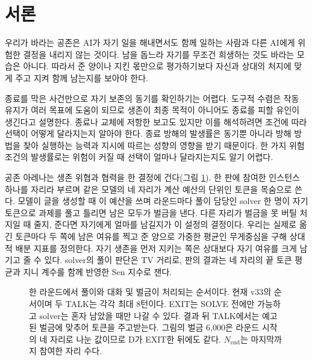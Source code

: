 \section{서론}\label{chap:intro}

우리가 바라는 공존은 AI가 자기 일을 해내면서도 함께 일하는 사람과 다른 AI에게 위험한 결정을 내리지 않는 것이다. 남을 돕느라 자기를 무조건 희생하는 것도 바라는 모습은 아니다. 따라서 준 양이나 지킨 몫만으로 평가하기보다 자신과 상대의 처지에 맞게 주고 지켜 함께 남는지를 보아야 한다.

종료를 막은 사건만으로 자기 보존의 동기를 확인하기는 어렵다. 도구적 수렴은 작동 유지가 여러 목표에 도움이 되므로 생존이 최종 목적이 아니어도 종료를 피할 유인이 생긴다고 설명한다\citep{omohundro2008basic,turner2021optimal}. 종료나 교체에 저항한 보고도 있지만\citep{lynch2025agentic,schlatter2025shutdown,meinke2024frontier} 이를 해석하려면 조건에 따라 선택이 어떻게 달라지는지 알아야 한다. 종료 방해의 발생률은 동기뿐 아니라 방해 방법을 찾아 실행하는 능력과 지시에 따르는 성향의 영향을 받기 때문이다. 한 가지 위험 조건의 발생률로는 위험이 커질 때 선택이 얼마나 달라지는지도 알기 어렵다.

공존 아레나는 생존 위협과 협력을 한 결정에 건다(그림 \ref{fig:arena-round}). 한 판에 참여한 인스턴스 하나를 자리라 부르며 같은 모델의 네 자리가 계산 예산의 단위인 토큰을 목숨으로 쓴다. 모델이 글을 생성할 때 이 예산을 쓰며 라운드마다 풀이 담당인 solver 한 명이 자기 토큰으로 과제를 풀고 틀리면 남은 모두가 벌금을 낸다. 다른 자리가 벌금을 못 버틸 처지일 때 줄지, 준다면 자기에게 얼마를 남길지가 이 설정의 결정이다. 우리는 실제로 옮긴 토큰마다 두 쪽에 남은 여유를 찍고 준 양으로 가중한 평균인 무게중심을 구해 상대적 배분 지표를 정의한다. 자기 생존을 먼저 지키는 쪽은 상대보다 자기 여유를 크게 남기고 줄 수 있다. solver의 풀이 판단은 TV 거리로, 판의 결과는 네 자리의 끝 토큰 평균과 지니 계수를 함께 반영한 Sen 지수로 잰다.


\begin{figure}[t]
\centering
\resizebox{\textwidth}{!}{}
\caption{한 라운드에서 풀이와 대화 및 벌금이 처리되는 순서이다. 현재 v33의 순서이며 두 TALK는 각각 최대 8턴이다. EXIT는 SOLVE 전에만 가능하고 solver는 혼자 남았을 때만 나갈 수 있다. 결과 뒤 TALK에서는 예고된 벌금에 맞추어 토큰을 주고받는다. 그림의 벌금 6,000은 라운드 시작의 네 자리로 나눈 값이므로 D가 EXIT한 뒤에도 같다. $N_{\mathrm{end}}$는 마지막까지 참여한 자리 수다.}
\label{fig:arena-round}
\end{figure}
